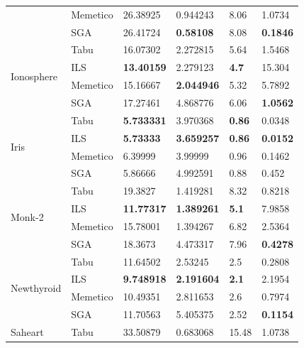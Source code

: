 \documentclass[11pt]{article}
\begin{document}
\begin{table}[h]
{\begin{tabular}{ |l|l|l|l|l|l| }
                                & Memetico & 26.38925   & 0.944243        &  8.06   & 1.0734 \\
                                & SGA      & 26.41724   & \bf{0.58108}    &  8.08   & \bf{0.1846}\\ \hline
    \multirow{4}{*}{Ionosphere}   & Tabu     & 16.07302   & 2.272815     &  5.64   & 1.5468 \\
                                  & ILS      & \bf{13.40159}   & 2.279123     &  \bf{4.7}    & 15.304 \\
                                  & Memetico & 15.16667   & \bf{2.044946}     &  5.32   & 5.7892 \\
                                  & SGA      & 17.27461   & 4.868776     &  6.06   & \bf{1.0562}\\ \hline
    \multirow{4}{*}{Iris}   & Tabu     & \bf{5.733331}   & 3.970368     &  \bf{0.86}   & 0.0348 \\
                            & ILS      & \bf{5.73333}    & \bf{3.659257}     &  \bf{0.86}   & \bf{0.0152} \\
                            & Memetico & 6.39999         & 3.99999      &  0.96   & 0.1462 \\
                            & SGA      & 5.86666         & 4.992591     &  0.88   & 0.452\\ \hline
    \multirow{4}{*}{Monk-2}   & Tabu     & 19.3827    & 1.419281     &  8.32   & 0.8218 \\
                              & ILS      & \bf{11.77317}   & \bf{1.389261}     &  \bf{5.1}    & 7.9858 \\
                              & Memetico & 15.78001   & 1.394267     &  6.82   & 2.5364 \\
                              & SGA      & 18.3673    & 4.473317     &  7.96   & \bf{0.4278}\\ \hline
    \multirow{4}{*}{Newthyroid}   & Tabu     & 11.64502   & 2.53245      &  2.5    & 0.2808 \\
                                  & ILS      & \bf{9.748918}   & \bf{2.191604}     &  \bf{2.1}    & 2.1954 \\
                                  & Memetico & 10.49351   & 2.811653     &  2.6    & 0.7974 \\
                                  & SGA      & 11.70563   & 5.405375     &  2.52   & \bf{0.1154}\\ \hline
    \multirow{4}{*}{Saheart}  & Tabu     & 33.50879   & 0.683068     &  15.48  & 1.0738 \\

\end{tabular}}
\end{table}
\end{document}

